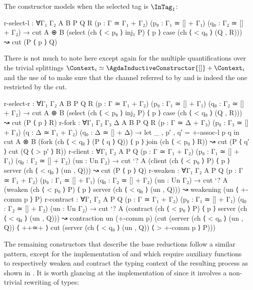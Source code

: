 The constructor  models \RSelect when the
selected tag is $\InTag_1$:

\begin{code}
  r-select-l  : ∀{Γ₁ Γ₂ A B P Q R}
                (p : Γ ≃ Γ₁ + Γ₂) (p₀ : Γ₁ ≃ [] + Γ₁) (q₀ : Γ₂ ≃ [] + Γ₂) →
                cut {A ⊕ B} (select (ch ⟨ < p₀ ⟩ inj₁ P) ⟨ p ⟩
                             case (ch ⟨ < q₀ ⟩ (Q , R))) ↝ cut (P ⟨ p ⟩ Q)
\end{code}

There is not much to note here except again for the multiple quantifications
over the trivial splittings $\Context_i \simeq \AgdaInductiveConstructor{[]} +
\Context_i$ and the use of \AgdaInductiveConstructor{<} to make sure that the
channel referred to by  and
 is indeed the one restricted by the cut.

\begin{code}[hide]
  r-select-r  : ∀{Γ₁ Γ₂ A B P Q R}
                (p : Γ ≃ Γ₁ + Γ₂) (p₀ : Γ₁ ≃ [] + Γ₁) (q₀ : Γ₂ ≃ [] + Γ₂) →
                cut {A ⊕ B} (select (ch ⟨ < p₀ ⟩ inj₂ P) ⟨ p ⟩
                             case (ch ⟨ < q₀ ⟩ (Q , R))) ↝ cut (P ⟨ p ⟩ R)
  r-fork      : ∀{Γ₁ Γ₂ Γ₃ Δ A B P Q R}
                (p : Γ ≃ Δ + Γ₃) (p₀ : Γ₃ ≃ [] + Γ₃) (q : Δ ≃ Γ₁ + Γ₂) (q₀ : Δ ≃ [] + Δ) →
                let _ , p′ , q′ = +-assoc-l p q in
                cut {A ⊗ B} (fork (ch ⟨ < q₀ ⟩ (P ⟨ q ⟩ Q)) ⟨ p ⟩
                             join (ch ⟨ < p₀ ⟩ R)) ↝ cut (P ⟨ q′ ⟩ cut (Q ⟨ > p′ ⟩ R))
  r-client    : ∀{Γ₁ Γ₂ A P Q}
                (p : Γ ≃ Γ₁ + Γ₂) (p₀ : Γ₁ ≃ [] + Γ₁) (q₀ : Γ₂ ≃ [] + Γ₂) (un : Un Γ₂) →
                cut {`? A} (client (ch ⟨ < p₀ ⟩ P) ⟨ p ⟩ server (ch ⟨ < q₀ ⟩ (un , Q))) ↝
                cut (P ⟨ p ⟩ Q)
  r-weaken    : ∀{Γ₁ Γ₂ A P Q}
                (p : Γ ≃ Γ₁ + Γ₂) (p₀ : Γ₁ ≃ [] + Γ₁) (q₀ : Γ₂ ≃ [] + Γ₂) (un : Un Γ₂) →
                cut {`? A} (weaken (ch ⟨ < p₀ ⟩ P) ⟨ p ⟩ server (ch ⟨ < q₀ ⟩ (un , Q))) ↝
                weakening (un ⟨ +-comm p ⟩ P)
  r-contract  : ∀{Γ₁ Γ₂ A P Q}
                (p : Γ ≃ Γ₁ + Γ₂) (p₀ : Γ₁ ≃ [] + Γ₁) (q₀ : Γ₂ ≃ [] + Γ₂) (un : Un Γ₂) →
                cut {`? A} (contract (ch ⟨ < p₀ ⟩ P) ⟨ p ⟩ server (ch ⟨ < q₀ ⟩ (un , Q))) ↝
                contraction un (+-comm p) (cut (server (ch ⟨ < q₀ ⟩ (un , Q)) ⟨ ++≃+ ⟩
                                           cut (server (ch ⟨ < q₀ ⟩ (un , Q)) ⟨ > +-comm p ⟩ P)))
\end{code}

The remaining constructors that describe the base reductions follow a similar
pattern, except for the implementation of \RWeaken and \RContract which require
auxiliary functions to respectively weaken and contract the typing context of
the resulting process as shown in . It is worth glancing at
the implementation of \RExists since it involves a non-trivial rewriting of
types:

